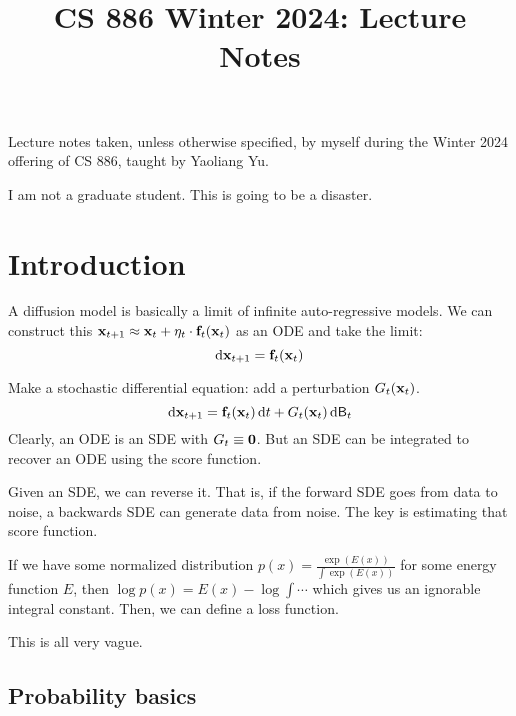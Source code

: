 \documentclass[notes]{agony}
\title{CS 886 Winter 2024: Lecture Notes}
\newcommand{\rv}{\mathsf}
\begin{document}
\renewcommand{\contentsname}{CS 886 Winter 2024:\\{\huge Lecture Notes}}
\thispagestyle{firstpage}
\tableofcontents

Lecture notes taken, unless otherwise specified,
by myself during the Winter 2024 offering of CS 886,
taught by Yaoliang Yu.

I am not a graduate student. This is going to be a disaster.

\begin{multicols}{2}
	\listoflecture
\end{multicols}

\chapter{Introduction}

A diffusion model is basically a limit of infinite auto-regressive models.
We can construct this $\vb x_{t+1} \approx \vb x_t + \eta_t \cdot \vb f_t(\vb x_t)$ as an ODE and take the limit:
\[ \dd{\vb x_{t+1}} = \vb f_t(\vb x_t) \]

Make a stochastic differential equation: add a perturbation $G_t(\vb x_t)$.
\[ \dd{\vb x_{t+1}} = \vb f_t(\vb x_t) \dd{t} + G_t(\vb x_t) \dd{\rv B_t} \]
Clearly, an ODE is an SDE with $G_t \equiv \vb 0$.
But an SDE can be integrated to recover an ODE using the score function.

Given an SDE, we can reverse it.
That is, if the forward SDE goes from data to noise,
a backwards SDE can generate data from noise.
The key is estimating that score function.

If we have some normalized distribution $p(x) = \frac{\exp(E(x))}{\int \exp(E(x))}$
for some energy function $E$, then $\log p(x) = E(x) - \log \int \cdots$
which gives us an ignorable integral constant.
Then, we can define a loss function.

This is all very vague.

\section{Probability basics}
\end{document}
